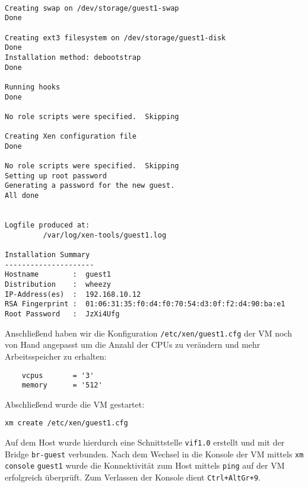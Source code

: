 \begin{verbatim}
                                                  
Creating swap on /dev/storage/guest1-swap         
Done                                              
                                                  
Creating ext3 filesystem on /dev/storage/guest1-disk
Done                                              
Installation method: debootstrap
Done

Running hooks
Done

No role scripts were specified.  Skipping

Creating Xen configuration file
Done

No role scripts were specified.  Skipping
Setting up root password
Generating a password for the new guest.
All done


Logfile produced at:
         /var/log/xen-tools/guest1.log

Installation Summary
---------------------
Hostname        :  guest1
Distribution    :  wheezy
IP-Address(es)  :  192.168.10.12 
RSA Fingerprint :  01:06:31:35:f0:d4:f0:70:54:d3:0f:f2:d4:90:ba:e1
Root Password   :  JzXi4Ufg
\end{verbatim}

Anschließend haben wir die Konfiguration \verb#/etc/xen/guest1.cfg# der VM noch von Hand angepasst um die Anzahl der CPUs zu verändern und mehr Arbeitsspeicher zu erhalten:
\setupVerbatimOut
\begin{verbatim}
    vcpus       = '3'
    memory      = '512'
\end{verbatim}

Abschließend wurde die VM gestartet:
\begin{verbatim}
xm create /etc/xen/guest1.cfg
\end{verbatim}

Auf dem Host wurde hierdurch eine Schnittstelle \verb#vif1.0# erstellt und mit der Bridge \verb#br-guest# verbunden. Nach dem Wechsel in die Konsole der VM mittels \verb#xm# \verb#console# \verb#guest1# wurde die Konnektivität zum Host mittels \verb#ping# auf der VM erfolgreich überprüft. Zum Verlassen der Konsole dient \verb#Ctrl+AltGr+9#.

